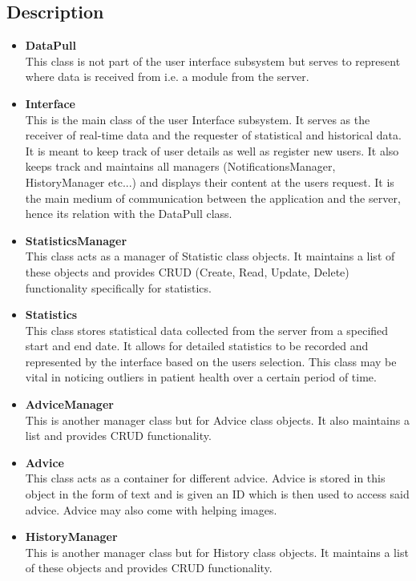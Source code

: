 \subsection{Description}
\begin{itemize}
	\item \textbf{DataPull}\\
	This class is not part of the user interface subsystem but serves to represent where data is received from i.e. a module from the server. 
	\item \textbf{Interface}\\
	This is the main class of the user Interface subsystem. It serves as the receiver of real-time data and the requester of statistical and historical data. It is meant to keep track of user details as well as register new users. It also keeps track and maintains all managers (NotificationsManager, HistoryManager etc...) and displays their content at the users request. It is the main medium of communication between the application and the server, hence its relation with the DataPull class. 
	\item \textbf{StatisticsManager}\\
	This class acts as a  manager of Statistic class objects. It maintains a list of these objects and provides CRUD (Create, Read, Update, Delete) functionality specifically for statistics. 
	\item \textbf{Statistics}\\
	This class stores statistical data collected from the server from a specified start and end date. It allows for detailed statistics to be recorded and represented by the interface based on the users selection. This class may be vital in noticing outliers in patient health over a certain period of time. 
	\item \textbf{AdviceManager}\\
	This is another manager class but for Advice class objects. It also maintains a list and provides CRUD functionality. 
	\item \textbf{Advice}\\
	This class acts as a container for different advice. Advice is stored in this object in the form of text and is given an ID which is then used to access said advice. Advice may also come with helping images.
  	\item \textbf{HistoryManager}\\
	This is another manager class but for History class objects. It maintains a list of these objects and provides CRUD functionality. 

\end{itemize}

